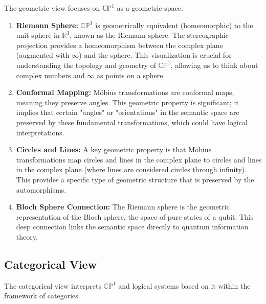 	The geometric view focuses on $\mathbb{CP}^1$ as a geometric space.
	
	\begin{enumerate}
		\item \textbf{Riemann Sphere:} $\mathbb{CP}^1$ is geometrically equivalent (homeomorphic) to the unit sphere in $\mathbb{R}^3$, known as the Riemann sphere. The stereographic projection provides a homeomorphism between the complex plane (augmented with $\infty$) and the sphere. This visualization is crucial for understanding the topology and geometry of $\mathbb{CP}^1$, allowing us to think about complex numbers and $\infty$ as points on a sphere.
		
		\item \textbf{Conformal Mapping:} M\"{o}bius transformations are conformal maps, meaning they preserve angles. This geometric property is significant; it implies that certain "angles" or "orientations" in the semantic space are preserved by these fundamental transformations, which could have logical interpretations.
		
		\item \textbf{Circles and Lines:} A key geometric property is that M\"{o}bius transformations map circles and lines in the complex plane to circles and lines in the complex plane (where lines are considered circles through infinity). This provides a specific type of geometric structure that is preserved by the automorphisms.
		
		\item \textbf{Bloch Sphere Connection:} The Riemann sphere is the geometric representation of the Bloch sphere, the space of pure states of a qubit. This deep connection links the semantic space directly to quantum information theory.
	\end{enumerate}
	
	\subsection{Categorical View}
	
	The categorical view interprets $\mathbb{CP}^1$ and logical systems based on it within the framework of categories.
	
